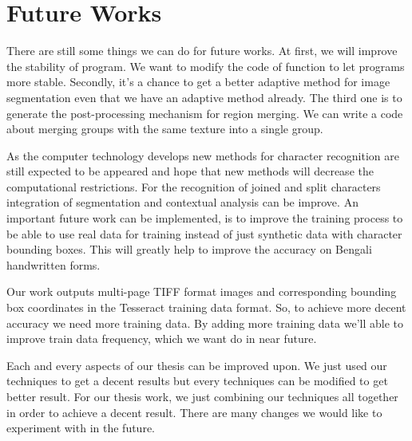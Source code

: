 \section{Future Works}

There are still some things we can do for future works. At first, we will improve the  stability of program. We want to modify the code of function to let programs more stable. Secondly, it’s a chance to get a better adaptive method for image segmentation even that we have an adaptive method already. The third one is to generate the post-processing mechanism for region merging. We can write a code about merging groups with the same texture into a single group.

As the computer technology develops new methods for character recognition are still expected to be appeared and hope that new methods will decrease the computational restrictions. For the recognition of joined and split characters integration of segmentation and contextual analysis can be improve. An important future work can be implemented, is to improve the training process to be able to use real data for training instead of just synthetic data with character bounding boxes. This will greatly help to improve the accuracy on Bengali handwritten forms.

Our work outputs multi-page TIFF format images and corresponding bounding box coordinates in the Tesseract training data format. So, to achieve more decent accuracy we need more training data. By adding more training data we’ll able to improve train data frequency, which we want do in near future.

Each and every aspects of our thesis can be improved upon. We just used our techniques to get a decent results but every techniques can be modified to get better result. For our thesis work, we just combining our techniques all together in order to achieve a decent result. There are many changes we would like to experiment with in the future.
